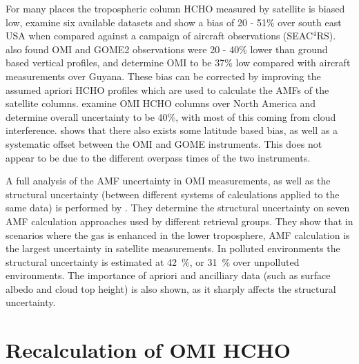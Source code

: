       
      For many places the tropospheric column HCHO measured by satellite is biased low, \textcite{Zhu2016} examine six available datasets and show a bias of 20 - 51\% over south east USA when compared against a campaign of aircraft observations (SEAC$^4$RS).
      \textcite{DeSmedt2015} also found OMI and GOME2 observations were 20 - 40\% lower than ground based vertical profiles, and \textcite{Barkley2013} determine OMI to be 37\% low compared with aircraft measurements over Guyana.
      These bias can be corrected by improving the assumed apriori HCHO profiles which are used to calculate the AMFs of the satellite columns.
      \textcite{Millet2006} examine OMI HCHO columns over North America and determine overall uncertainty to be 40\%, with most of this coming from cloud interference.
      \textcite{Millet2008} shows that there also exists some latitude based bias, as well as a systematic offset between the OMI and GOME instruments.
      This does not appear to be due to the different overpass times of the two instruments.
      
      
      A full analysis of the AMF uncertainty in OMI measurements, as well as the structural uncertainty (between different systems of calculations applied to the same data) is performed by \textcite{Lorente2017}.
      They determine the structural uncertainty on seven AMF calculation approaches used by different retrieval groups.
      They show that in scenarios where the gas is enhanced in the lower troposphere, AMF calculation is the largest uncertainty in satellite measurements.
      In polluted environments the structural uncertainty is estimated at 42~\%, or 31~\% over unpolluted environments.
      The importance of apriori and ancilliary data (such as surface albedo and cloud top height) is also shown, as it sharply affects the structural uncertainty.
      
      

\section{Recalculation of OMI HCHO}
  
